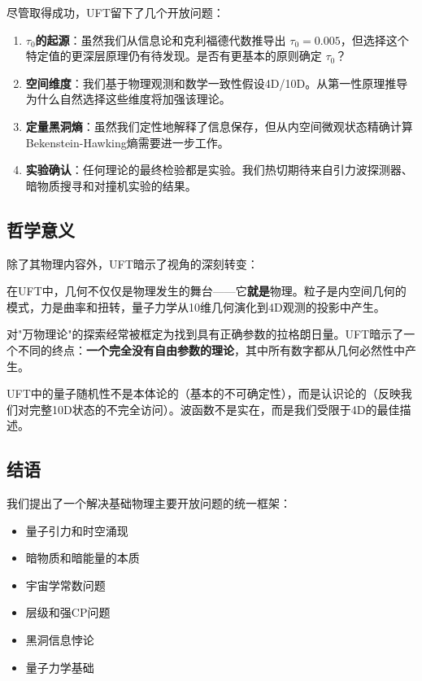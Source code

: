 尽管取得成功，UFT留下了几个开放问题：

\begin{enumerate}
    \item \textbf{$\tau_0$的起源}：虽然我们从信息论和克利福德代数推导出 $\tau_0 = 0.005$，但选择这个特定值的更深层原理仍有待发现。是否有更基本的原则确定 $\tau_0$？
    
    \item \textbf{空间维度}：我们基于物理观测和数学一致性假设4D/10D。从第一性原理推导为什么自然选择这些维度将加强该理论。
    
    \item \textbf{定量黑洞熵}：虽然我们定性地解释了信息保存，但从内空间微观状态精确计算Bekenstein-Hawking熵需要进一步工作。
    
    \item \textbf{实验确认}：任何理论的最终检验都是实验。我们热切期待来自引力波探测器、暗物质搜寻和对撞机实验的结果。
\end{enumerate}

\subsection{哲学意义}

除了其物理内容外，UFT暗示了视角的深刻转变：

\begin{insight}[几何是根本]
在UFT中，几何不仅仅是物理发生的舞台——它\textbf{就是}物理。粒子是内空间几何的模式，力是曲率和扭转，量子力学从10维几何演化到4D观测的投影中产生。
\end{insight}

\begin{insight}[参数的终结]
对"万物理论"的探索经常被框定为找到具有正确参数的拉格朗日量。UFT暗示了一个不同的终点：\textbf{一个完全没有自由参数的理论}，其中所有数字都从几何必然性中产生。
\end{insight}

\begin{insight}[认识论的量子力学]
UFT中的量子随机性不是本体论的（基本的不可确定性），而是认识论的（反映我们对完整10D状态的不完全访问）。波函数不是实在，而是我们受限于4D的最佳描述。
\end{insight}

\subsection{结语}

我们提出了一个解决基础物理主要开放问题的统一框架：
\begin{itemize}
    \item 量子引力和时空涌现
    \item 暗物质和暗能量的本质
    \item 宇宙学常数问题
    \item 层级和强CP问题
    \item 黑洞信息悖论
    \item 量子力学基础
\end{itemize}

